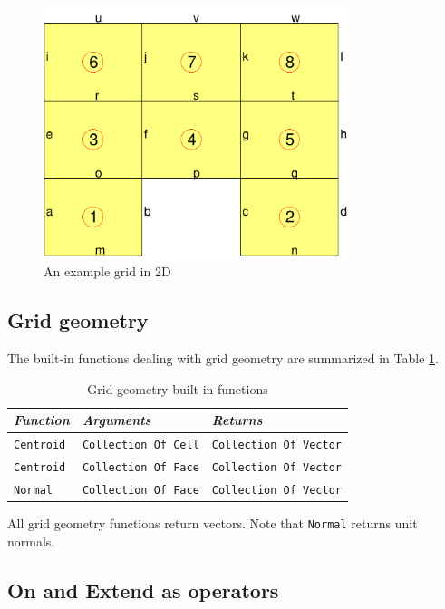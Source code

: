 \documentclass[11pt]{article}
\newcommand{\code}[1]{\texttt{#1}}
\begin{document}
\begin{figure}
\centering
\includegraphics[width=0.8\textwidth]{grid-enumeration}
\caption{An example grid in 2D}
\label{fig:2dgrid}
\end{figure}

\subsection{Grid geometry}

The built-in functions dealing with grid geometry are summarized in Table
\ref{tab:geomfunc}.

\begin{table}
\begin{tabular}{l|l|l}
{\em Function} & {\em Arguments} & {\em Returns} \\
\hline
\code{Centroid} & \code{Collection Of Cell} & \code{Collection Of Vector} \\
\code{Centroid} & \code{Collection Of Face} & \code{Collection Of Vector} \\
\code{Normal} & \code{Collection Of Face} & \code{Collection Of Vector} \\
\end{tabular}
\caption{Grid geometry built-in functions}
\label{tab:geomfunc}
\end{table}

All grid geometry functions return vectors. Note that \code{Normal} returns unit normals.


\subsection{On and Extend as operators}
\label{subsec:on-extend}
\end{document}
